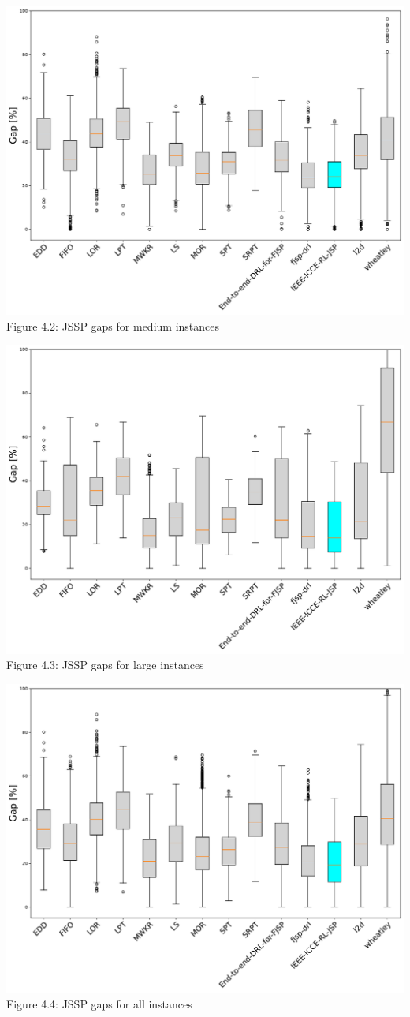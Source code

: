 \begin{center}
    \includegraphics[width=0.8\linewidth]{images/horizontal_boxplot_jssp_medium.pdf}\\
    Figure 4.2: JSSP gaps for medium instances
\end{center}
\begin{center}
    \includegraphics[width=0.8\linewidth]{images/horizontal_boxplot_jssp_large.pdf}\\
    Figure 4.3: JSSP gaps for large instances
\end{center}
\begin{center}
    \includegraphics[width=0.8\linewidth]{images/horizontal_boxplot_jssp_all.pdf}\\
    Figure 4.4: JSSP gaps for all instances
\end{center}

